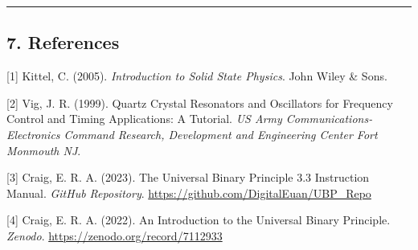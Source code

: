 \begin{center}\rule{0.5\linewidth}{0.5pt}\end{center}

\subsection{7. References}\label{references}

{[}1{]} Kittel, C. (2005). \emph{Introduction to Solid State Physics}.
John Wiley \& Sons.

{[}2{]} Vig, J. R. (1999). Quartz Crystal Resonators and Oscillators for
Frequency Control and Timing Applications: A Tutorial. \emph{US Army
Communications-Electronics Command Research, Development and Engineering
Center Fort Monmouth NJ}.

{[}3{]} Craig, E. R. A. (2023). The Universal Binary Principle 3.3
Instruction Manual. \emph{GitHub Repository}.
\url{https://github.com/DigitalEuan/UBP_Repo}

{[}4{]} Craig, E. R. A. (2022). An Introduction to the Universal Binary
Principle. \emph{Zenodo}. \url{https://zenodo.org/record/7112933}
